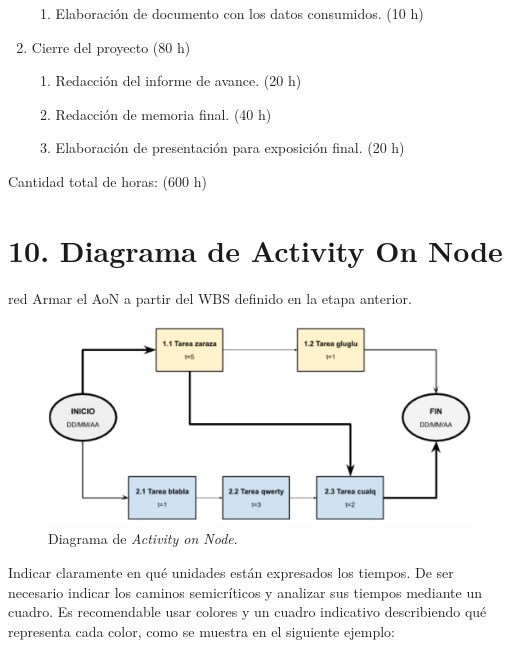 \documentclass[
11pt, %
]{charter}
\begin{document}
\begin{enumerate}
\begin{enumerate}
			\item Elaboración de documento con los datos consumidos. (10 h)
		\end{enumerate}
	\item Cierre del proyecto (80 h)
		\begin{enumerate}
			\item Redacción del informe de avance. (20 h)
			\item Redacción de memoria final. (40 h)
			\item Elaboración de presentación para exposición final. (20 h) 
		\end{enumerate}
\end{enumerate}

Cantidad total de horas: (600 h)


\section{10. Diagrama de Activity On Node}
\label{sec:AoN}

\begin{consigna}{red}
Armar el AoN a partir del WBS definido en la etapa anterior. 



\end{consigna}

\begin{figure}[htpb]
\centering 
\includegraphics[width=.8\textwidth]{./Figuras/AoN.png}
\caption{Diagrama de \textit{Activity on Node}.}
\label{fig:AoN}
\end{figure}

Indicar claramente en qué unidades están expresados los tiempos.
De ser necesario indicar los caminos semicríticos y analizar sus tiempos mediante un cuadro.
Es recomendable usar colores y un cuadro indicativo describiendo qué representa cada color, como se muestra en el siguiente ejemplo:
\end{document}
